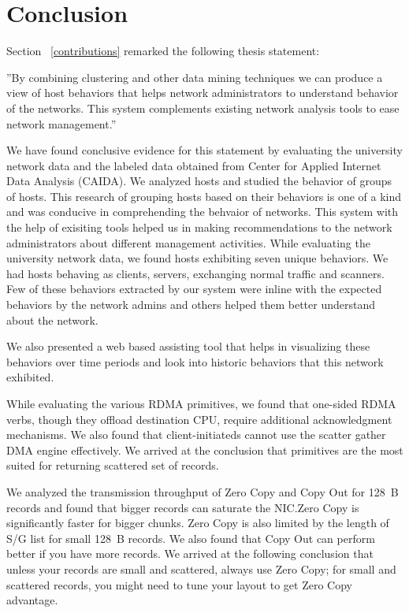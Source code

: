 
\chapter{Conclusion} \label{chap:conclusion}

Section ~\ref{contributions} remarked the following thesis statement:

''By combining clustering and other data mining techniques we can produce a view of host behaviors that helps network administrators to understand behavior of the networks. This system complements existing network analysis tools to ease network management.''

We have found conclusive evidence for this statement by evaluating the university network data and the labeled data obtained from Center for Applied Internet Data Analysis (CAIDA). We analyzed hosts and studied the behavior of groups of hosts. This research of grouping hosts based on their behaviors is one of a kind and was conducive in comprehending the behvaior of networks. This system with the help of exisiting tools helped us in making recommendations to the network administrators about different management activities.
While evaluating the university network data, we found hosts exhibiting seven unique behaviors. We had hosts behaving as clients, servers, exchanging normal traffic and scanners. Few of these behaviors extracted by our system were inline with the expected behaviors by the network admins and others helped them better understand about the network.   

We also presented a web based assisting tool that helps in visualizing these behaviors over time periods and look into historic behaviors that this network exhibited.

While evaluating the various RDMA primitives, we found that one-sided RDMA verbs, though they offload destination CPU, 
require additional acknowledgment mechanisms. We also found that client-initiateds cannot use the scatter gather DMA engine effectively. We arrived at the conclusion that primitives 
are the most suited for returning scattered set of records.

We analyzed the transmission throughput of Zero Copy and Copy Out for 128~B records and found that bigger records can saturate the NIC.Zero Copy is significantly faster for bigger chunks. Zero Copy is also limited by the length of S/G list for small 128~B records.
We also found that Copy Out can perform better if you have more records. We arrived at the following conclusion that 
unless your records are small and scattered, always use Zero Copy; for small and scattered records, you might need to tune your layout to get Zero Copy advantage.

